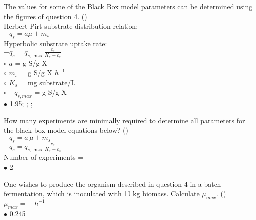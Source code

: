 \documentclass[]{beamer}
\begin{document}
\begin{frame}[shrink] {} 
\color{blue}
The values for some of the Black Box model parameters can be determined using the figures of question 4. ({\color{green}{Q4b}})\\
Herbert Pirt substrate distribution relation:\\[0.3em]
\color{gray}
$−q_s=a\mu+m_s$ \\[0.3em]
\color{blue}
Hyperbolic substrate uptake rate:\\
\color{gray}
$- q_s^{} = q_{s,\max }^{}\frac{{c_s^{}}}{{K_s^{} + c_s^{}}}$\\[0.3em]
\color{black}
\setlength{\parindent}{-0.4cm}
{\color{red}$\circ$} $a$ =  \underline{\quad} g S/g X \\
{\color{red}$\circ$} $m_s$ = \underline{\quad} g S/g X $h^{-1}$\\
{\color{red}$\circ$} $K_s$ = \underline{\quad} mg substrate/L \\
{\color{red}$\circ$} $-q_{s,max}$ =\underline{\quad} g S/g X\\[0.5em]
{\color{red}$\bullet$} 1.95; ; ; 
\end{frame}


\begin{frame}[shrink] {} 
\color{blue}
How many  experiments are minimally required to determine all parameters for the black box model equations below? ({\color{green}{Q4c}})\\
\color{gray}
$- q_s^{} = a\,\mu  + m_s^{}$\\[0.3em]
$- q_s^{} = q_{s,\max }^{}\frac{{c_s^{}}}{{K_s^{} + c_s^{}}}$\\[0.3em]
\color{blue}
Number of experiments = \underline{\quad }\\[0.5em]
\color{black}
\setlength{\parindent}{-0.4cm}
{\color{red}$\bullet$} 2\\
\end{frame}


\begin{frame}[shrink] {} 
\color{blue}
One wishes to produce the organism described in question 4 in a batch fermentation, which is inoculated with 10 kg biomass. Calculate $\mu_{max}$. ({\color{green}{Q5a}})\\
\color{black}
\setlength{\parindent}{-0.4cm}
$\mu_{max} =\underline{\quad } h^{-1}$\\[0.5em]
{\color{red}$\bullet$} 0.245\\
\end{frame}
\end{document}
